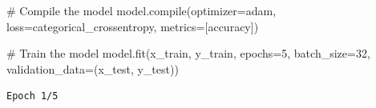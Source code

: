 \documentclass[
  letterpaper,
  DIV=11,
  numbers=noendperiod]{scrreprt}
\newenvironment{Shaded}{\begin{snugshade}}{\end{snugshade}}
\newcommand{\BuiltInTok}[1]{\textcolor[rgb]{0.00,0.23,0.31}{#1}}
\newcommand{\CommentTok}[1]{\textcolor[rgb]{0.37,0.37,0.37}{#1}}
\newcommand{\DecValTok}[1]{\textcolor[rgb]{0.68,0.00,0.00}{#1}}
\newcommand{\NormalTok}[1]{\textcolor[rgb]{0.00,0.23,0.31}{#1}}
\newcommand{\OperatorTok}[1]{\textcolor[rgb]{0.37,0.37,0.37}{#1}}
\newcommand{\StringTok}[1]{\textcolor[rgb]{0.13,0.47,0.30}{#1}}
\begin{document}
\begin{Shaded}
\begin{Highlighting}[]
\CommentTok{\# Compile the model}
\NormalTok{model.}\BuiltInTok{compile}\NormalTok{(optimizer}\OperatorTok{=}\StringTok{\textquotesingle{}adam\textquotesingle{}}\NormalTok{, loss}\OperatorTok{=}\StringTok{\textquotesingle{}categorical\_crossentropy\textquotesingle{}}\NormalTok{, metrics}\OperatorTok{=}\NormalTok{[}\StringTok{\textquotesingle{}accuracy\textquotesingle{}}\NormalTok{])}

\CommentTok{\# Train the model}
\NormalTok{model.fit(x\_train, y\_train, epochs}\OperatorTok{=}\DecValTok{5}\NormalTok{, batch\_size}\OperatorTok{=}\DecValTok{32}\NormalTok{, validation\_data}\OperatorTok{=}\NormalTok{(x\_test, y\_test))}
\end{Highlighting}
\end{Shaded}

\begin{verbatim}
Epoch 1/5

\end{verbatim}
\end{document}
